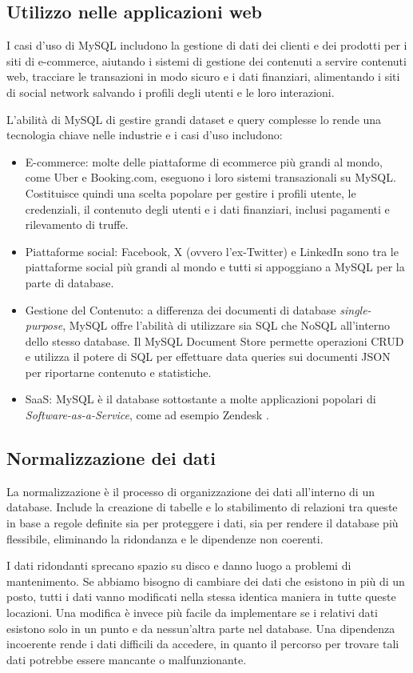 \subsection{Utilizzo nelle applicazioni web}
I casi d'uso di MySQL includono la gestione di dati dei clienti e dei prodotti per i siti di e-commerce, aiutando i sistemi di gestione dei contenuti a servire contenuti web, tracciare le transazioni in modo sicuro e i dati finanziari, alimentando i siti di social network salvando i profili degli utenti e le loro interazioni.

L'abilità di MySQL di gestire grandi dataset e query complesse lo rende una tecnologia chiave nelle industrie e i casi d'uso includono:
\begin{itemize}
    \item E-commerce: molte delle piattaforme di ecommerce più grandi al mondo, come Uber e Booking.com, eseguono i loro sistemi transazionali su MySQL. Costituisce quindi una scelta popolare per gestire i profili utente, le credenziali, il contenuto degli utenti e i dati finanziari, inclusi pagamenti e rilevamento di truffe.
    \item Piattaforme social: Facebook, X (ovvero l'ex-Twitter) e LinkedIn sono tra le piattaforme social più grandi al mondo e tutti si appoggiano a MySQL per la parte di database.
    \item Gestione del Contenuto: a differenza dei documenti di database \textit{single-purpose}, MySQL offre l'abilità di utilizzare sia SQL che NoSQL all'interno dello stesso database. Il MySQL Document Store permette operazioni CRUD e utilizza il potere di SQL per effettuare data queries sui documenti JSON per riportarne contenuto e statistiche.
    \item SaaS: MySQL è il database sottostante a molte applicazioni popolari di \textit{Software-as-a-Service}, come ad esempio Zendesk \cite{MySQL}.
\end{itemize}

\subsection{Normalizzazione dei dati}
La normalizzazione è il processo di organizzazione dei dati all'interno di un database. Include la creazione di tabelle e lo stabilimento di relazioni tra queste in base a regole definite sia per proteggere i dati, sia per rendere il database più flessibile, eliminando la ridondanza e le dipendenze non coerenti.

I dati ridondanti sprecano spazio su disco e danno luogo a problemi di mantenimento. Se abbiamo bisogno di cambiare dei dati che esistono in più di un posto, tutti i dati vanno modificati nella stessa identica maniera in tutte queste locazioni. Una modifica è invece più facile da implementare se i relativi dati esistono solo in un punto e da nessun'altra parte nel database. Una dipendenza incoerente rende i dati difficili da accedere, in quanto il percorso per trovare tali dati potrebbe essere mancante o malfunzionante.

